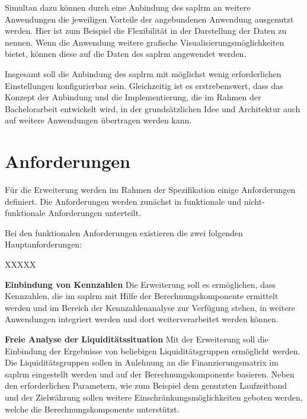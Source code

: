 \begin{onehalfspacing}
Simultan dazu können durch eine Anbindung des \gls{saplrm} an weitere Anwendungen die jeweiligen Vorteile der angebundenen Anwendung ausgenutzt werden. Hier ist zum Beispiel die Flexibilität in der Darstellung der Daten zu nennen. Wenn die Anwendung weitere grafische Visualisierungsmöglichkeiten bietet, können diese auf die Daten des \gls{saplrm} angewendet werden.

Insgesamt soll die Anbindung des \gls{saplrm} mit möglichst wenig erforderlichen Einstellungen konfigurierbar sein. Gleichzeitig ist es erstrebenswert, dass das Konzept der Anbindung und die Implementierung, die im Rahmen der Bachelorarbeit entwickelt wird, in der grundsätzlichen Idee und Architektur auch auf weitere Anwendungen übertragen werden kann.

\section{Anforderungen}
\label{sec:anforderungen}
Für die Erweiterung werden im Rahmen der Spezifikation einige Anforderungen definiert. Die Anforderungen werden zunächst in funktionale und nicht-funktionale Anforderungen unterteilt. 

Bei den funktionalen Anforderungen existieren die zwei folgenden Hauptanforderungen:

\begin{seToplist}{ XXXXX }

\item[\anfl{kpi}] \textbf{Einbindung von Kennzahlen} \newline
Die Erweiterung soll es ermöglichen, dass Kennzahlen, die im \gls{saplrm} mit Hilfe der Berechnungskomponente ermittelt werden und im Bereich der Kennzahlenanalyse zur Verfügung stehen, in weitere Anwendungen integriert werden und dort weiterverarbeitet werden können.

\item[\anfl{fundingMatrix}] \textbf{Freie Analyse der Liquiditätssituation} \newline
Mit der Erweiterung soll die Einbindung der Ergebnisse von beliebigen Liquiditätsgruppen ermöglicht werden. Die Liquiditätsgruppen sollen in Anlehnung an die Finanzierungsmatrix im \gls{saplrm} eingestellt werden und auf der Berechnungskomponente basieren. Neben den erforderlichen Parametern, wie zum Beispiel dem genutzten Laufzeitband und der Zielwährung sollen weitere Einschränkungsmöglichkeiten geboten werden, welche die Berechnungskomponente unterstützt.

\end{seToplist}


\end{onehalfspacing}
